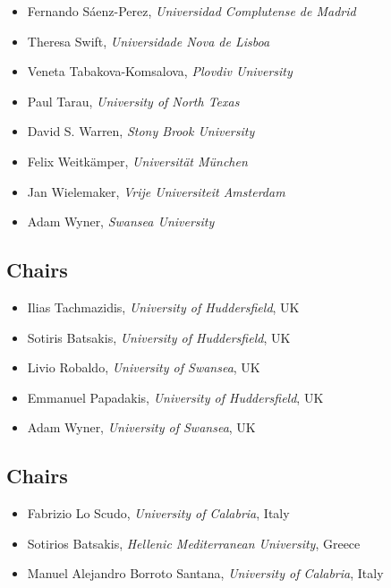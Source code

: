 \documentclass[
]{ceurart}
\begin{document}
\begin{itemize}
\item Fernando Sáenz-Perez, \emph{Universidad Complutense de Madrid}
\item Theresa Swift, \emph{Universidade Nova de Lisboa}
\item Veneta Tabakova-Komsalova, \emph{Plovdiv University}
\item Paul Tarau, \emph{University of North Texas}
\item David S. Warren, \emph{Stony Brook University}
\item Felix Weitkämper, \emph{Universität München}
\item Jan Wielemaker, \emph{Vrije Universiteit Amsterdam}
\item Adam Wyner, \emph{Swansea University}
\end{itemize}



\subsection*{Chairs}
\begin{itemize}
\item Ilias Tachmazidis, \emph{University of Huddersfield}, UK

\item Sotiris Batsakis, \emph{University of Huddersfield}, UK

\item Livio Robaldo, \emph{University of Swansea}, UK

\item Emmanuel Papadakis, \emph{University of Huddersfield}, UK

\item Adam Wyner, \emph{University of Swansea}, UK
\end{itemize}


\subsection*{Chairs}
\begin{itemize}
\item Fabrizio Lo Scudo, \emph{University of Calabria}, Italy

\item Sotirios Batsakis, \emph{Hellenic Mediterranean University}, Greece

\item Manuel Alejandro Borroto Santana, \emph{University of Calabria}, Italy
\end{itemize}
\end{document}
